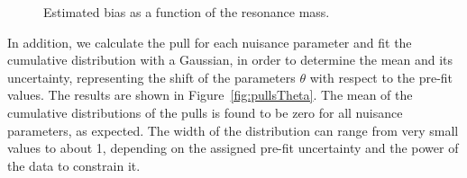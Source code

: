 \begin{figure}[h!]
\centering
{}
\caption{Estimated bias as a function of the resonance mass.}
\label{fig:bias}
\end{figure}
In addition, we calculate the pull for each nuisance parameter and fit the cumulative distribution with a Gaussian, in order to determine the mean and its uncertainty, representing the shift of the parameters $\theta$ with respect to the pre-fit values. The results are shown in Figure~\ref{fig:pullsTheta}. The mean of the cumulative distributions of the pulls is found to be zero for all nuisance parameters, as expected. The width of the distribution can range from very small values to about 1, depending on the assigned pre-fit uncertainty and the power of the data to constrain it.
